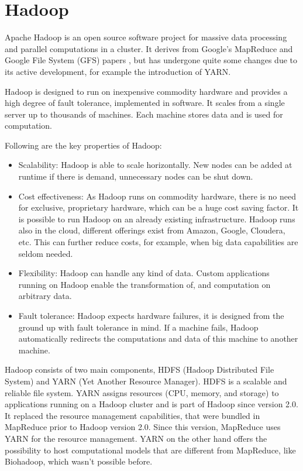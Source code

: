 \chapter{Hadoop}
\label{chap:hadoop}
Apache Hadoop \cite{hadoop} is an open source software project for massive data processing and parallel computations in a cluster. It derives from Google's MapReduce \cite{dean2008mapreduce} and Google File System (GFS) papers \cite{ghemawat2003google}, but has undergone quite some changes due to its active development, for example the introduction of YARN.

Hadoop is designed to run on inexpensive commodity hardware and provides a high degree of fault tolerance, implemented in software. It scales from a single server up to thousands of machines. Each machine stores data and is used for computation.

Following are the key properties of Hadoop:
\begin{itemize}
  \item Scalability: Hadoop is able to scale horizontally. New nodes can be added at runtime if there is demand, unnecessary nodes can be shut down.
  \item Cost effectiveness: As Hadoop runs on commodity hardware, there is no need for exclusive, proprietary hardware, which can be a huge cost saving factor. It is possible to run Hadoop on an already existing infrastructure. Hadoop runs also in the cloud, different offerings exist from Amazon, Google, Cloudera, etc. This can further reduce costs, for example, when big data capabilities are seldom needed.
  \item Flexibility: Hadoop can handle any kind of data. Custom applications running on Hadoop enable the transformation of, and computation on arbitrary data.
  \item Fault tolerance: Hadoop expects hardware failures, it is designed from the ground up with fault tolerance in mind. If a machine fails, Hadoop automatically redirects the computations and data of this machine to another machine.
\end{itemize}

Hadoop consists of two main components, HDFS (Hadoop Distributed File System) and YARN (Yet Another Resource Manager). HDFS is a scalable and reliable file system. YARN assigns resources (CPU, memory, and storage) to applications running on a Hadoop cluster and is part of Hadoop since version 2.0. It replaced the resource management capabilities, that were bundled in MapReduce prior to Hadoop version 2.0. Since this version, MapReduce uses YARN for the resource management. YARN on the other hand offers the possibility to host computational models that are different from MapReduce, like Biohadoop, which wasn't possible before.

